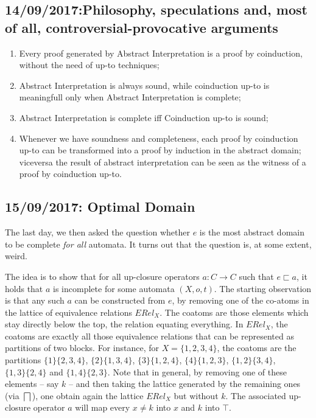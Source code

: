 \documentclass{llncs}
\begin{document}
\subsection{14/09/2017:Philosophy, speculations and, most of all, controversial-provocative arguments}
\begin{enumerate}
\item Every proof generated by Abstract Interpretation is a proof by coinduction, without the need of up-to techniques;
\item Abstract Interpretation is always sound, while coinduction up-to is meaningfull only when Abstract Interpretation is complete;
\item Abstract Interpretation is complete iff Coinduction up-to is sound;
\item Whenever we have soundness and completeness, each proof by coinduction up-to can be transformed into a proof by induction in the abstract domain; viceversa the result of abstract interpretation can be seen as the witness of a proof by coinduction up-to.   
\end{enumerate}
%





\subsection{15/09/2017: Optimal Domain}
The last day, we then asked the question whether $e$ is the most abstract domain to be complete \emph{for all} automata. It turns out that the question is, at some extent, weird. 

The idea is to show that for all up-closure operators $a\colon C\to C$ such that $e\sqsubset a$, it holds that $a$ is incomplete for some automata $(X,o,t)$. The starting observation is that any such $a$ can be constructed from $e$, by removing one of the co-atoms in the lattice of equivalence relations $ERel_X$. The coatoms are those elements which stay directly below the top, the relation equating everything. In $ERel_X$, the coatoms are exactly all those equivalence relations that can be represented as partitions of two blocks. For instance, for $X=\{1,2,3,4\}$, the coatoms are the partitions $\{1\}\{2,3,4\}$, $\{2\}\{1,3,4\}$, $\{3\}\{1,2,4\}$, $\{4\}\{1,2,3\}$, $\{1,2\}\{3,4\}$, $\{1,3\}\{2,4\}$ and $\{1,4\}\{2,3\}$. Note that in general, by removing one of these elements -- say $k$ -- and then taking the lattice generated by the remaining ones (via $\bigsqcap$), one obtain again the lattice $ERel_X$ but without $k$. The associated up-closure operator $a$ will map every $x\neq k$ into $x$ and $k$ into $\top$. 
\end{document}
